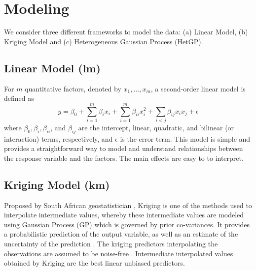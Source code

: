 \documentclass [PhD] {package/uclathes}
\begin{document}
\section{Modeling}\label{sec:models}
We consider three different frameworks to model the data: (a) Linear Model, (b) Kriging Model and (c) Heterogeneous Gaussian Process (HetGP).

\subsection*{{Linear Model (lm)}}

For $m$ quantitative factors, denoted by $x_1, \ldots, x_m$, a second-order linear model is defined as
\begin{equation}
y=\beta_0+\sum_{i=1}^m \beta_i x_i+\sum_{i=1}^m \beta_{i i} x_i^2+\sum_{i<j} \beta_{i j} x_i x_j+\epsilon
\end{equation}
where $\beta_0, \beta_i, \beta_{i i}$, and $\beta_{i j}$ are the intercept, linear, quadratic, and bilinear (or interaction) terms, respectively, and $\epsilon$ is the error term. This model is simple and provides a straightforward way to model and understand relationships between the response variable and the factors. The main effects are easy to to interpret.  %

\subsection*{Kriging Model (km)}
Proposed by South African geostatistician \textcite{krige1951statistical}, Kriging is one of the methods used to interpolate intermediate values, whereby these intermediate values are modeled using Gaussian Process (GP) which is governed by prior co-variances.  It provides a probabilistic prediction of the output variable, as well as an estimate of the uncertainty of the prediction \parencite{chevalier2014kriginv}. The kriging predictors interpolating the observations are assumed to be noise-free \parencite{roustant2012dicekriging}. Intermediate interpolated values obtained by Kriging are the best linear unbiased predictors. %
\end{document}
